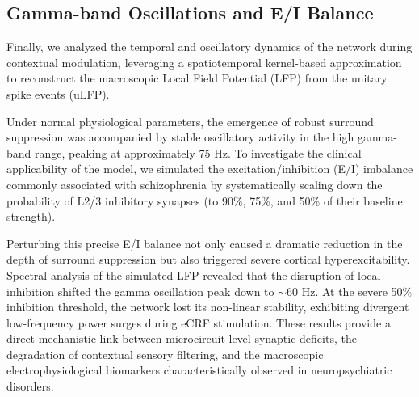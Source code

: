 \subsection{Gamma-band Oscillations and E/I Balance}
Finally, we analyzed the temporal and oscillatory dynamics of the network during contextual modulation, leveraging a spatiotemporal kernel-based approximation to reconstruct the macroscopic Local Field Potential (LFP) from the unitary spike events (uLFP). 

Under normal physiological parameters, the emergence of robust surround suppression was accompanied by stable oscillatory activity in the high gamma-band range, peaking at approximately 75 Hz. To investigate the clinical applicability of the model, we simulated the excitation/inhibition (E/I) imbalance commonly associated with schizophrenia by systematically scaling down the probability of L2/3 inhibitory synapses (to 90\%, 75\%, and 50\% of their baseline strength). 

Perturbing this precise E/I balance not only caused a dramatic reduction in the depth of surround suppression but also triggered severe cortical hyperexcitability. Spectral analysis of the simulated LFP revealed that the disruption of local inhibition shifted the gamma oscillation peak down to $\sim 60$ Hz. At the severe 50\% inhibition threshold, the network lost its non-linear stability, exhibiting divergent low-frequency power surges during eCRF stimulation. These results provide a direct mechanistic link between microcircuit-level synaptic deficits, the degradation of contextual sensory filtering, and the macroscopic electrophysiological biomarkers characteristically observed in neuropsychiatric disorders.